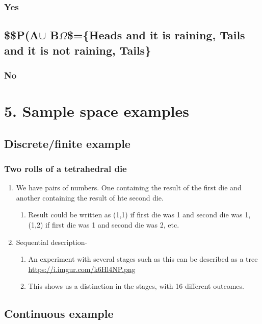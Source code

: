 \documentclass[11pt]{article}
\begin{document}
\subsubsection{Yes}
\label{sec:orgbad0e75}
\subsection{\$\$P(A\(\cup\) B\(\Omega\)\$=\{Heads and it is raining, Tails and it is not raining, Tails\}}
\label{sec:org0e6655e}
\subsubsection{No}
\label{sec:orgd630e9e}
\section{5. Sample space examples}
\label{sec:orge5ea451}
\subsection{Discrete/finite example}
\label{sec:org0163a4b}
\subsubsection{Two rolls of a tetrahedral die}
\label{sec:org828bfd1}
\begin{enumerate}
\item We have pairs of numbers. One containing the result of the first die and another containing the result of hte second die.
\label{sec:org748774c}
\begin{enumerate}
\item Result could be written as (1,1) if first die was 1 and second die was 1, (1,2) if first die was 1 and second die was 2, etc.
\label{sec:org2966f2b}
\end{enumerate}
\item Sequential description-
\label{sec:orgfbe0fe6}
\begin{enumerate}
\item An experiment with several stages such as this can be described as a tree
\label{sec:org226ed4f}
\url{https://i.imgur.com/k6Hl4NP.png}
\item This shows us a distinction in the stages, with 16 different outcomes.
\label{sec:orgd1fc6d9}
\end{enumerate}
\end{enumerate}
\subsection{Continuous example}
\label{sec:org058f57d}
\end{document}
